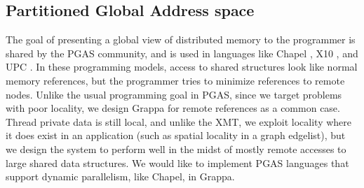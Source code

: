 \subsection{Partitioned Global Address space}
The goal of presenting a global view of distributed memory to the programmer is shared by the PGAS community, and is used in languages like Chapel \cite{Chapel}, X10 \cite{X10}, and UPC \cite{UPC}. In these programming models, access to shared structures look like normal memory references, but the programmer tries to minimize references to remote nodes. Unlike the usual programming goal in PGAS, since we target problems with poor locality, we design Grappa for remote references as a common case. Thread private data is still local, and unlike the XMT, we exploit locality where it does exist in an application (such as spatial locality in a graph edgelist), but we design the system to perform well in the midst of mostly remote accesses to large shared data structures. We would like to implement PGAS languages that support dynamic parallelism, like Chapel, in Grappa.
